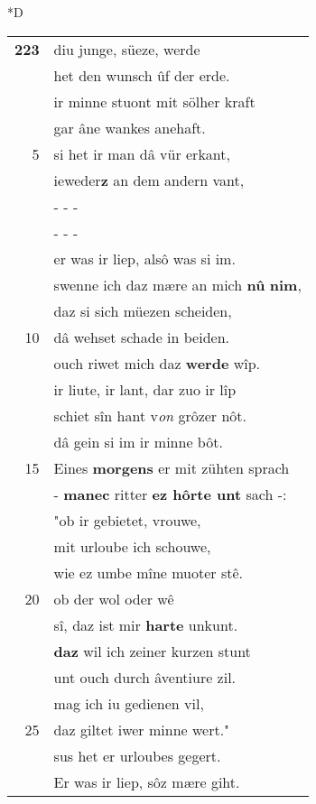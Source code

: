 \documentclass[8pt,a4paper,notitlepage]{article}
\begin{document}
\begin{table}[ht]
\begin{minipage}[t]{0.5\linewidth}
\small
\begin{center}*D
\end{center}
\begin{tabular}{rl}
\textbf{223} & diu junge, süeze, werde\\ 
 & het den wunsch ûf der erde.\\ 
 & ir minne stuont mit sölher kraft\\ 
 & gar âne wankes anehaft.\\ 
5 & si het ir man dâ vür erkant,\\ 
 & ieweder\textbf{z} an dem andern vant,\\ 
 & \multicolumn{1}{l}{ - - - }\\ 
 & \multicolumn{1}{l}{ - - - }\\ 
 & er was ir liep, alsô was si im.\\ 
 & swenne ich daz mære an mich \textbf{nû} \textbf{nim},\\ 
 & daz si sich müezen scheiden,\\ 
10 & dâ wehset schade in beiden.\\ 
 & ouch riwet mich daz \textbf{werde} wîp.\\ 
 & ir liute, ir lant, dar zuo ir lîp\\ 
 & schiet sîn hant v\textit{on} grôzer nôt.\\ 
 & dâ gein si im ir minne bôt.\\ 
15 & Eines \textbf{morgens} er mit zühten sprach\\ 
 & - \textbf{manec} ritter \textbf{ez hôrte unt} sach -:\\ 
 & "ob ir gebietet, vrouwe,\\ 
 & mit urloube ich schouwe,\\ 
 & wie ez umbe mîne muoter stê.\\ 
20 & ob der wol oder wê\\ 
 & sî, daz ist mir \textbf{harte} unkunt.\\ 
 & \textbf{daz} wil ich zeiner kurzen stunt\\ 
 & unt ouch durch âventiure zil.\\ 
 & mag ich iu gedienen vil,\\ 
25 & daz giltet iwer minne wert."\\ 
 & sus het er urloubes gegert.\\ 
 & Er was ir liep, sôz mære giht.\\ 

\end{tabular}
\end{minipage}
\end{table}
\end{document}
